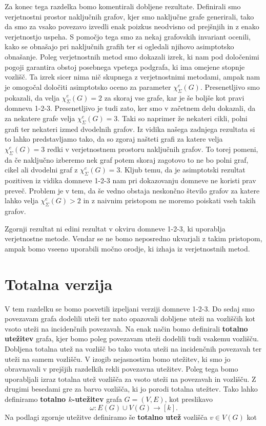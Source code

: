 \documentclass[12pt,a4paper,twoside]{article}
\theoremstyle{definition} %
\theoremstyle{plain} %
\newcommand{\ec}{\chi_{\Sigma}^e}
\numberwithin{equation}{section}  %
\begin{document}
Za konec tega razdelka bomo komentirali dobljene rezultate. Definirali smo verjetnostni prostor naključnih grafov, kjer smo naključne grafe generirali, tako da smo za vsako povezavo izvedli enak poizkus neodvisno od prejšnjih in z enako verjetnostjo uspeha. S pomočjo tega smo za nekaj grafovskih invariant ocenili, kako se obnašajo pri naključnih grafih ter si ogledali njihovo asimptotsko obnašanje. Poleg verjetnostnih metod smo dokazali izrek, ki nam pod določenimi pogoji garantira obstoj posebnega vpetega podgrafa, ki ima omejene stopnje vozlišč. Ta izrek sicer nima nič skupnega z verjetnostnimi metodami, ampak nam je omogočal določiti asimptotsko oceno za parameter $\ec(G)$. Presenetljivo smo pokazali, da velja $\ec(G) = 2$ za skoraj vse grafe, kar je še boljše kot pravi domneva 1-2-3. Presenetljivo je tudi zato, ker smo v začetnem delu dokazali, da za nekatere grafe velja $\ec(G) = 3$. Taki so naprimer že nekateri cikli, polni grafi ter nekateri izmed dvodelnih grafov. Iz vidika našega zadnjega rezultata si to lahko predstavljamo tako, da so zgoraj našteti grafi za katere velja $\ec(G) = 3$ redki v verjetnostnem prostoru naključnih grafov. To torej pomeni, da če naključno izberemo nek graf potem skoraj zagotovo to ne bo polni graf, cikel ali dvodelni graf z $\ec(G) = 3$. Kljub temu, da je asimptotski rezultat pozitiven iz vidika domneve 1-2-3 nam pri dokazovanju domneve ne koristi prav preveč. Problem je v tem, da še vedno obstaja neskončno število grafov za katere lahko velja $\ec(G) > 2$ in z naivnim pristopom ne moremo poiskati vseh takih grafov.

Zgornji rezultat ni edini rezultat v okviru domneve 1-2-3, ki uporablja verjetnostne metode. Vendar se ne bomo neposredno ukvarjali z takim pristopom, ampak bomo vseeno uporabili močno orodje, ki izhaja iz verjetnostnih metod.

\section{Totalna verzija}
V tem razdelku se bomo posvetili izpeljani verziji domneve 1-2-3. Do sedaj smo povezavam grafa dodelili uteži ter nato opazovali dobljene uteži na vozliščih kot vsoto uteži na incidenčnih povezavah. Na enak način bomo definirali \textbf{totalno utežitev} grafa, kjer bomo poleg povezavam uteži dodelili tudi vsakemu vozlišču. Dobljena totalna utež na vozlišč bo tako vsota uteži na incidenčnih povezavah ter uteži na samem vozlišču. V izogib nejasnostim bomo utežitev, ki smo jo obravnavali v prejšjih razdelkih rekli povezavna utežitev. Poleg tega bomo uporabljali izraz totalna utež vozlišča za vsoto uteži na povezavah in vozlišču. Z drugimi besedami gre za barvo vozlišča, ki jo porodi totalna utežtev. Tako lahko definiramo \textbf{totalno $k$-utežitev} grafa $G=(V,E)$, kot preslikavo
$$ \omega : E(G) \cup V(G) \rightarrow [k]. $$
Na podlagi zgornje utežitve definiramo še \textbf{totalno utež} vozlišča $v \in V(G)$ kot
\end{document}
